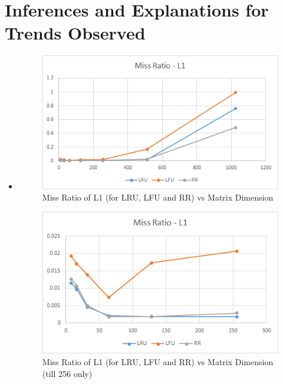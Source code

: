 \documentclass{article}
\begin{document}
\section{Inferences and Explanations for Trends Observed}
\begin{itemize}
    \item
        \begin{figure}[htbp]
        \centering
        \includegraphics[scale=1.0]{missratio_l1.png}
        \caption{Miss Ratio of L1 (for LRU, LFU and RR) vs Matrix Dimension}
        \end{figure}

        \begin{figure}[htbp]
        \centering
        \includegraphics[scale=1.0]{missratio_l1_magnified.png}
        \caption{Miss Ratio of L1 (for LRU, LFU and RR) vs Matrix Dimension (till 256 only)}
        \end{figure}


\end{itemize}
\end{document}
